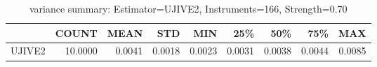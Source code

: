 \begin{table}[ht]
\centering
\caption{variance summary: Estimator=UJIVE2, Instruments=166, Strength=0.70}
\begin{tabular}{lrrrrrrrr}
\toprule
 & COUNT & MEAN & STD & MIN & 25\% & 50\% & 75\% & MAX \\
\midrule
UJIVE2 & 10.0000 & 0.0041 & 0.0018 & 0.0023 & 0.0031 & 0.0038 & 0.0044 & 0.0085 \\
\bottomrule
\end{tabular}
\end{table}
